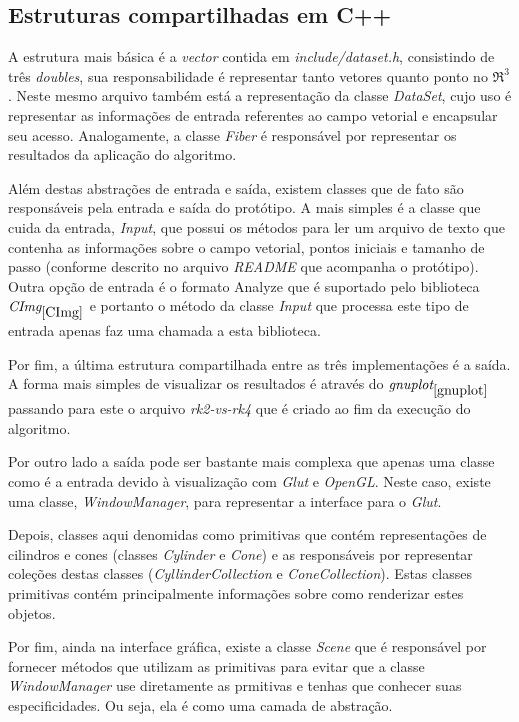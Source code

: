   \subsection{Estruturas compartilhadas em C++}
  A estrutura mais básica é a \textit{vector} contida em \textit{include/dataset.h}, consistindo de três \textit{doubles}, sua responsabilidade é representar tanto vetores quanto ponto no $\Re ^{3}$. Neste mesmo arquivo também está a representação da classe \textit{DataSet}, cujo uso é representar as informações de entrada referentes ao campo vetorial e encapsular seu acesso. Analogamente, a classe \textit{Fiber} é responsável por representar os resultados da aplicação do algoritmo.
  
  Além destas abstrações de entrada e saída, existem classes que de fato são responsáveis pela entrada e saída do protótipo. A mais simples é a classe que cuida da entrada, \textit{Input}, que possui os métodos para ler um arquivo de texto que contenha as informações sobre o campo vetorial, pontos iniciais e tamanho de passo (conforme descrito no arquivo \textit{README} que acompanha o protótipo). Outra opção de entrada é o formato Analyze que é suportado pelo biblioteca $\textit{CImg}_{\ref{CImg}}$ e portanto o método da classe \textit{Input} que processa este tipo de entrada apenas faz uma chamada a esta biblioteca.
  
  Por fim, a última estrutura compartilhada entre as três implementações é a saída. A forma mais simples de visualizar os resultados é através do $\textit{gnuplot}_{\ref{gnuplot}}$ passando para este o arquivo \textit{rk2-vs-rk4} que é criado ao fim da execução do algoritmo.
  
  Por outro lado a saída pode ser bastante mais complexa que apenas uma classe como é a entrada devido à visualização com \textit{Glut} e \textit{OpenGL}. Neste caso, existe uma classe, \textit{WindowManager}, para representar a interface para o \textit{Glut}.
  
  Depois, classes aqui denomidas como primitivas que contém representações de cilindros e cones (classes \textit{Cylinder} e \textit{Cone}) e as responsáveis por representar coleções destas classes (\textit{CyllinderCollection} e \textit{ConeCollection}). Estas classes primitivas contém principalmente informações sobre como renderizar estes objetos.
  
  Por fim, ainda na interface gráfica, existe a classe \textit{Scene} que é responsável por fornecer métodos que utilizam as primitivas para evitar que a classe \textit{WindowManager} use diretamente as prmitivas e tenhas que conhecer suas especificidades. Ou seja, ela é como uma camada de abstração. 
  
